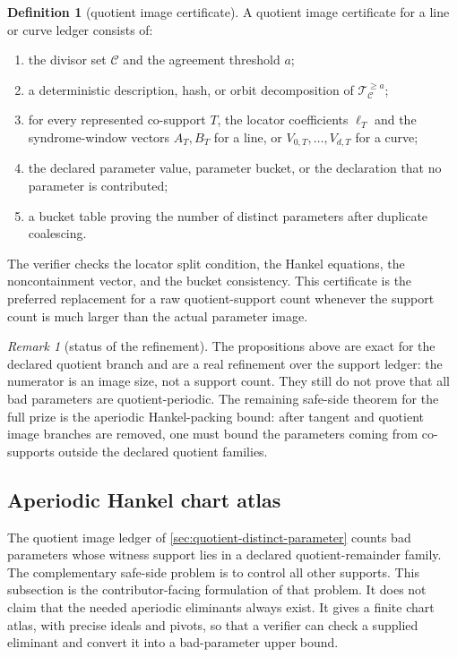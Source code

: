 \documentclass[11pt]{article}
\theoremstyle{definition}
\newtheorem{definition}[definition]{Definition}
\theoremstyle{remark}
\newtheorem{remark}[remark]{Remark}
\begin{document}
\begin{definition}[quotient image certificate]
\label{def:quotient-image-certificate}
A quotient image certificate for a line or curve ledger consists of:
\begin{enumerate}[label=\textup{(\roman*)}]
\item the divisor set $\mathcal C$ and the agreement threshold $a$;
\item a deterministic description, hash, or orbit decomposition of
$\mathcal T_{\mathcal C}^{\ge a}$;
\item for every represented co-support $T$, the locator coefficients
$\boldsymbol\ell_T$ and the syndrome-window vectors $A_T,B_T$ for a line, or
$V_{0,T},\ldots,V_{d,T}$ for a curve;
\item the declared parameter value, parameter bucket, or the declaration that no
parameter is contributed;
\item a bucket table proving the number of distinct parameters after duplicate
coalescing.
\end{enumerate}
The verifier checks the locator split condition, the Hankel equations, the
noncontainment vector, and the bucket consistency.  This certificate is the
preferred replacement for a raw quotient-support count whenever the support count
is much larger than the actual parameter image.
\end{definition}

\begin{remark}[status of the refinement]
\label{rem:distinct-ledger-status}
The propositions above are exact for the declared quotient branch and are a real
refinement over the support ledger: the numerator is an image size, not a support
count.  They still do not prove that all bad parameters are quotient-periodic.
The remaining safe-side theorem for the full prize is the aperiodic Hankel-packing
bound: after tangent and quotient image branches are removed, one must bound the
parameters coming from co-supports outside the declared quotient families.
\end{remark}


\subsection{Aperiodic Hankel chart atlas}
\label{sec:aperiodic-hankel-certificates}

The quotient image ledger of \cref{sec:quotient-distinct-parameter} counts bad
parameters whose witness support lies in a declared quotient-remainder family.
The complementary safe-side problem is to control all other supports.  This
subsection is the contributor-facing formulation of that problem.  It does not claim
that the needed aperiodic eliminants always exist.  It gives a finite chart
atlas, with precise ideals and pivots, so that a verifier can check a supplied
eliminant and convert it into a bad-parameter upper bound.
\end{document}
